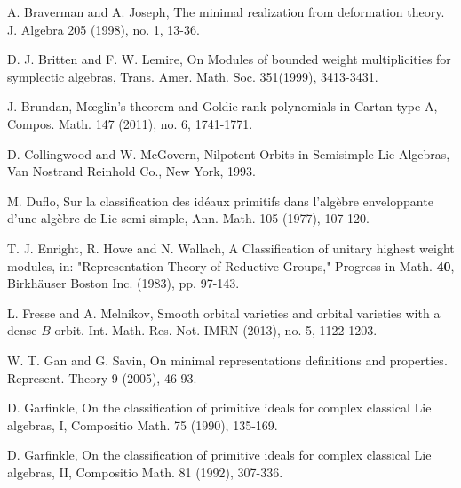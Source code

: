 \documentclass{amsart}[12pt]
\numberwithin{equation}{section}
\begin{document}
\begin{thebibliography}{99}
A. Braverman and A. Joseph,
The minimal realization from deformation theory.
J. Algebra 205 (1998), no. 1, 13-36.


D. J. Britten and F. W. Lemire,   On Modules of bounded weight multiplicities for symplectic algebras,  Trans. Amer. Math. Soc. 351(1999), 3413-3431.


 J. Brundan,
M{\oe}glin's theorem and Goldie rank polynomials in Cartan type A, Compos. Math. 147 (2011), no. 6, 1741-1771.



D. Collingwood and W. McGovern, Nilpotent Orbits in Semisimple Lie Algebras, Van Nostrand Reinhold Co.,
New York, 1993.




M. Duflo,  Sur la classification des id\'{e}aux primitifs dans l'alg\`{e}bre enveloppante d'une alg\`{e}bre de Lie semi-simple, Ann. Math. 105 (1977), 107-120.






T. J. Enright, R. Howe and N. Wallach, A Classification of unitary highest weight modules, in: "Representation
Theory of Reductive Groups," Progress in Math. {\bf 40}, Birkh\"{a}user
Boston Inc. (1983), pp. 97-143.
%
%
%
%


L. Fresse and A. Melnikov,  Smooth orbital varieties and orbital varieties with a dense $B$-orbit. Int. Math. Res. Not. IMRN  (2013),  no. 5, 1122-1203.




W. T. Gan and G. Savin, On minimal representations definitions and properties. Represent. Theory 9 (2005), 46-93.



D. Garfinkle, On the classification of primitive ideals for complex classical Lie algebras, I, Compositio Math. 75 (1990), 135-169.


D. Garfinkle, On the classification of primitive ideals for complex classical Lie algebras, II, Compositio Math. 81 (1992), 307-336.


\end{thebibliography}
\end{document}
